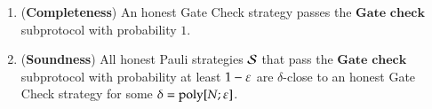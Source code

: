 

\begin{lemma}	
\label{lem:prop_check}
\leavevmode
\begin{enumerate}
\item (\textbf{Completeness}) An honest Gate Check strategy passes the $\textbf{Gate check}$ subprotocol with probability $1$. 
\item (\textbf{Soundness}) All honest Pauli strategies $\mathcal{S}$ that pass the $\textbf{Gate check}$ subprotocol with probability at least $1 - \varepsilon$ are $\delta$-close to an honest Gate Check strategy for some $\delta = \operatorname{poly}[N;\varepsilon]$.
\end{enumerate}
\end{lemma}
